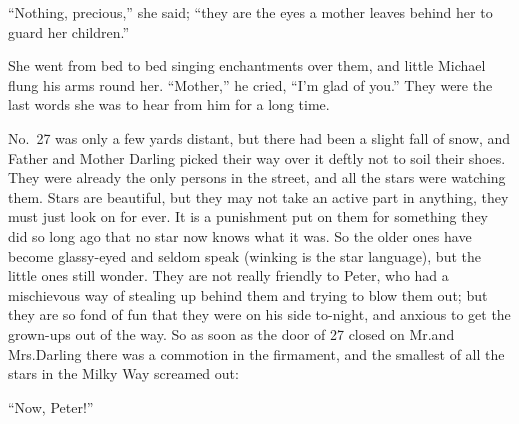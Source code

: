 “Nothing, precious,” she said;
“they are the eyes a mother leaves behind her to guard her children.”

She went from bed to bed singing enchantments over them,
and little Michael flung his arms round her.
“Mother,” he cried, “I’m glad of you.”
They were the last words she was to hear from him for a long time.

No.~27 was only a few yards distant,
but there had been a slight fall of snow,
and Father and Mother Darling picked their way over it deftly not to soil their shoes.
They were already the only persons in the street, and all the stars were watching them.
Stars are beautiful, but they may not take an active part in anything, they must just look on for ever.
It is a punishment put on them for something they did so long ago that no star now knows what it was.
So the older ones have become glassy-eyed and seldom speak (winking is the star language),
but the little ones still wonder.
They are not really friendly to Peter,
who had a mischievous way of stealing up behind them and trying to blow them out;
but they are so fond of fun that they were on his side to-night,
and anxious to get the grown-ups out of the way.
So as soon as the door of 27 closed on Mr.\@ and Mrs.\@ Darling there was a commotion in the firmament,
and the smallest of all the stars in the Milky Way screamed out:

“Now, Peter!”

\endinput
